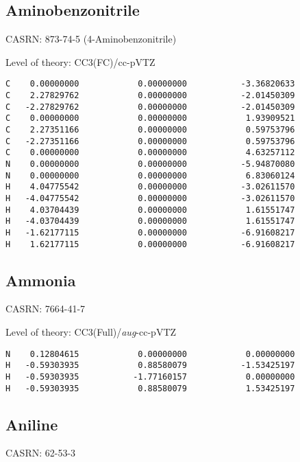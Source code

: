 \documentclass[journal=jctcce,manuscript=article,layout=traditional]{achemso}
\newcommand{\TZ}{cc-pVTZ}
\newcommand{\AVTZ}{\emph{aug}-cc-pVTZ}
\begin{document}
\subsection{Aminobenzonitrile}

CASRN: 873-74-5 (4-Aminobenzonitrile)

\begin{singlespace}
\noindent Level of theory: CC3(FC)/{\TZ}
\begin{verbatim}
C    0.00000000            0.00000000           -3.36820633
C    2.27829762            0.00000000           -2.01450309
C   -2.27829762            0.00000000           -2.01450309
C    0.00000000            0.00000000            1.93909521
C    2.27351166            0.00000000            0.59753796
C   -2.27351166            0.00000000            0.59753796
C    0.00000000            0.00000000            4.63257112
N    0.00000000            0.00000000           -5.94870080
N    0.00000000            0.00000000            6.83060124
H    4.04775542            0.00000000           -3.02611570
H   -4.04775542            0.00000000           -3.02611570
H    4.03704439            0.00000000            1.61551747
H   -4.03704439            0.00000000            1.61551747
H   -1.62177115            0.00000000           -6.91608217
H    1.62177115            0.00000000           -6.91608217
\end{verbatim}
\end{singlespace}

\subsection{Ammonia}

CASRN: 7664-41-7

\begin{singlespace}
\noindent Level of theory: CC3(Full)/{\AVTZ}
\begin{verbatim}
N    0.12804615            0.00000000            0.00000000
H   -0.59303935            0.88580079           -1.53425197
H   -0.59303935           -1.77160157            0.00000000
H   -0.59303935            0.88580079            1.53425197  
\end{verbatim}
\end{singlespace}

\subsection{Aniline}

CASRN: 62-53-3
\end{document}
